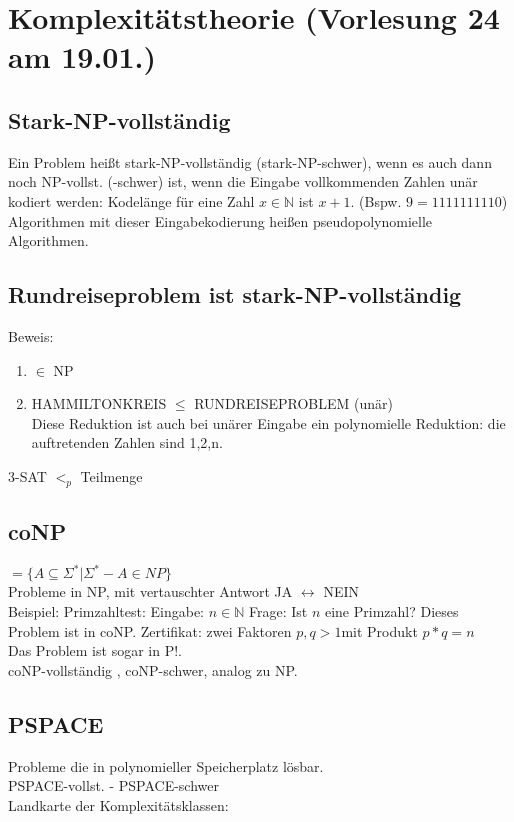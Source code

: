 \section{ Komplexitätstheorie \tiny (Vorlesung 24 am 19.01.)}
\subsection{Stark-NP-vollständig}
Ein Problem heißt stark-NP-vollständig (stark-NP-schwer), wenn es auch dann noch NP-vollst. (-schwer) ist, wenn die Eingabe vollkommenden Zahlen unär kodiert werden: Kodelänge für eine Zahl $x \in \mathbb{N}$ ist $x+1$. (Bspw. $9 = 1111111110$)\\
Algorithmen mit dieser Eingabekodierung heißen pseudopolynomielle Algorithmen.\\
\subsection{Rundreiseproblem ist stark-NP-vollständig}
Beweis:
\begin{enumerate}
\item $\in$ NP
\item HAMMILTONKREIS $\leq$ RUNDREISEPROBLEM (unär)\\
Diese Reduktion ist auch bei unärer Eingabe ein polynomielle Reduktion: die auftretenden Zahlen sind 1,2,n.
\end{enumerate}
3-SAT $<_p$ Teilmenge
\subsection{coNP}
$= \{ A \subseteq \Sigma^* | \Sigma^* - A \in NP\}$\\
Probleme in NP, mit vertauschter Antwort JA $\leftrightarrow$ NEIN\\
Beispiel: Primzahltest:
Eingabe: $n \in \mathbb{N}$
Frage: Ist $n$ eine Primzahl?
Dieses Problem ist in coNP. Zertifikat: zwei Faktoren $p,q > 1$mit Produkt $p*q = n$\\
Das Problem ist sogar in P!.\\
coNP-vollständig , coNP-schwer, analog zu NP.\\
\subsection{PSPACE}
Probleme die in polynomieller Speicherplatz lösbar.\\
PSPACE-vollst. - PSPACE-schwer\\
Landkarte der Komplexitätsklassen:\\
